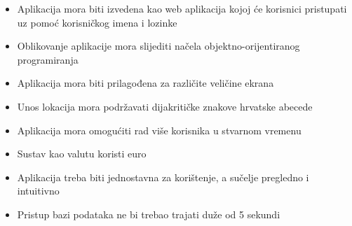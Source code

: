 		    \begin{itemize}
		        \item Aplikacija mora biti izvedena kao web aplikacija kojoj će korisnici pristupati uz pomoć korisničkog imena i lozinke
		        \item Oblikovanje aplikacije mora slijediti načela objektno-orijentiranog programiranja
		        \item Aplikacija mora biti prilagođena za različite veličine ekrana
		        \item Unos lokacija mora podržavati dijakritičke znakove hrvatske abecede
		        \item Aplikacija mora omogućiti rad više korisnika u stvarnom vremenu
		        \item Sustav kao valutu koristi euro
		        \item Aplikacija treba biti jednostavna za korištenje, a sučelje pregledno i intuitivno
		        \item Pristup bazi podataka ne bi trebao trajati duže od 5 sekundi
		    \end{itemize}
			 
	